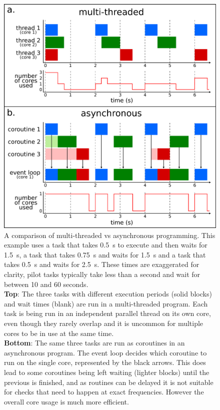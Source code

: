 \begin{colsection}
\begin{colsection}
\begin{figure}[p]
    \begin{center}
        \includegraphics[width=0.89\linewidth]{images/async.pdf} %
    \end{center}
    \caption[Multi-threaded vs asynchronous programming]{
        A comparison of multi-threaded vs asynchronous programming. This example uses a  task that takes \SI{0.5}{\second} to execute and then waits for \SI{1.5}{\second}, a  task that takes \SI{0.75}{\second} and waits for \SI{1.5}{\second} and a  task that takes \SI{0.5}{\second} and waits for \SI{2.5}{\second}. These times are exaggerated for clarity, pilot tasks typically take less than a second and wait for between 10 and 60 seconds. \\
        \textbf{Top}: The three tasks with different execution periods (solid blocks) and wait times (blank) are run in a multi-threaded program. Each task is being run in an independent parallel thread on its own core, even though they rarely overlap and it is uncommon for multiple cores to be in use at the same time. \\
        \textbf{Bottom}: The same three tasks are run as coroutines in an asynchronous program. The event loop decides which coroutine to run on the single core, represented by the black arrows. This does lead to some coroutines being left waiting (lighter blocks) until the previous is finished, and as routines can be delayed it is not suitable for checks that need to happen at exact frequencies. However the overall core usage is much more efficient.
    }\label{fig:async}
\end{figure}


\end{colsection}
\end{colsection}
